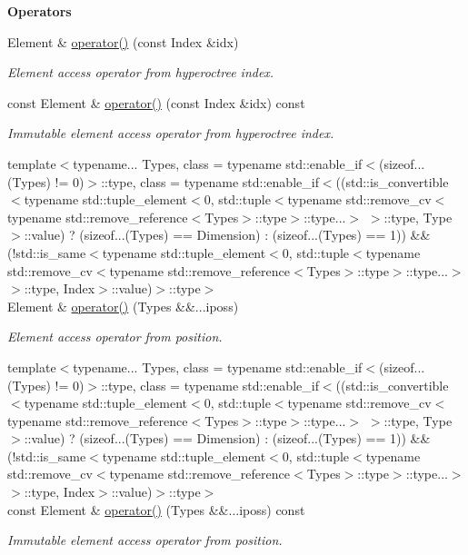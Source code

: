 \begin{Indent}{\bf Operators}
\begin{DoxyCompactItemize}
Element \& \hyperlink{exceptionmagrathea_1_1SimpleHyperOctree_acd21a6ab68148d61143be3bd0cef9c73}{operator()} (const Index \&idx)
\begin{DoxyCompactList}\small\item\em Element access operator from hyperoctree index. \end{DoxyCompactList}\item 
const Element \& \hyperlink{exceptionmagrathea_1_1SimpleHyperOctree_a4a0cc7552a3ae390e84d28e57166b699}{operator()} (const Index \&idx) const 
\begin{DoxyCompactList}\small\item\em Immutable element access operator from hyperoctree index. \end{DoxyCompactList}\item 
{\footnotesize template$<$typename... Types, class  = typename std\-::enable\-\_\-if$<$(sizeof...(\-Types) != 0)$>$\-::type, class  = typename std\-::enable\-\_\-if$<$((std\-::is\-\_\-convertible$<$typename std\-::tuple\-\_\-element$<$0, std\-::tuple$<$typename std\-::remove\-\_\-cv$<$typename std\-::remove\-\_\-reference$<$\-Types$>$\-::type$>$\-::type...$>$ $>$\-::type, Type$>$\-::value) ? (sizeof...(\-Types) == Dimension) \-: (sizeof...(\-Types) == 1)) \&\& (!std\-::is\-\_\-same$<$typename std\-::tuple\-\_\-element$<$0, std\-::tuple$<$typename std\-::remove\-\_\-cv$<$typename std\-::remove\-\_\-reference$<$\-Types$>$\-::type$>$\-::type...$>$ $>$\-::type, Index$>$\-::value)$>$\-::type$>$ }\\Element \& \hyperlink{exceptionmagrathea_1_1SimpleHyperOctree_a54da7a09dc7fc70123a6ec24c670b8dd}{operator()} (Types \&\&...iposs)
\begin{DoxyCompactList}\small\item\em Element access operator from position. \end{DoxyCompactList}\item 
{\footnotesize template$<$typename... Types, class  = typename std\-::enable\-\_\-if$<$(sizeof...(\-Types) != 0)$>$\-::type, class  = typename std\-::enable\-\_\-if$<$((std\-::is\-\_\-convertible$<$typename std\-::tuple\-\_\-element$<$0, std\-::tuple$<$typename std\-::remove\-\_\-cv$<$typename std\-::remove\-\_\-reference$<$\-Types$>$\-::type$>$\-::type...$>$ $>$\-::type, Type$>$\-::value) ? (sizeof...(\-Types) == Dimension) \-: (sizeof...(\-Types) == 1)) \&\& (!std\-::is\-\_\-same$<$typename std\-::tuple\-\_\-element$<$0, std\-::tuple$<$typename std\-::remove\-\_\-cv$<$typename std\-::remove\-\_\-reference$<$\-Types$>$\-::type$>$\-::type...$>$ $>$\-::type, Index$>$\-::value)$>$\-::type$>$ }\\const Element \& \hyperlink{exceptionmagrathea_1_1SimpleHyperOctree_afda010767e52b1ecda984476418a01fd}{operator()} (Types \&\&...iposs) const 
\begin{DoxyCompactList}\small\item\em Immutable element access operator from position. \end{DoxyCompactList}\end{DoxyCompactItemize}
\end{Indent}
